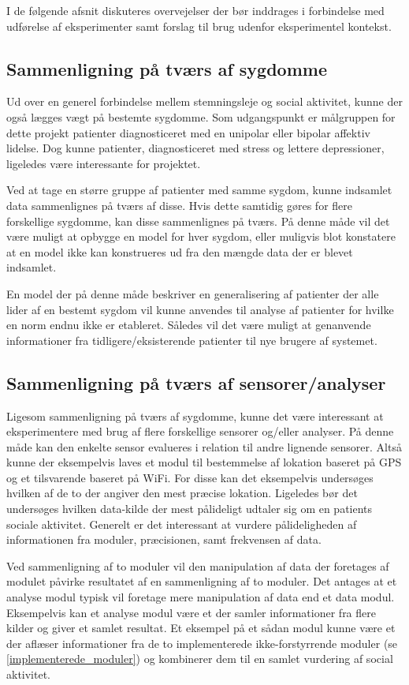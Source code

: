 I de følgende afsnit diskuteres overvejelser der bør inddrages i forbindelse med udførelse af eksperimenter samt forslag til brug udenfor eksperimentel kontekst.

\subsection{Sammenligning på tværs af sygdomme}\label{refleksion:tvaers_af_sygdomme}
Ud over en generel forbindelse mellem stemningsleje og social aktivitet, kunne der også lægges vægt på bestemte sygdomme.
Som udgangspunkt er målgruppen for dette projekt patienter diagnosticeret med en unipolar eller bipolar affektiv lidelse.
Dog kunne patienter, diagnosticeret med stress og lettere depressioner, ligeledes være interessante for projektet.

Ved at tage en større gruppe af patienter med samme sygdom, kunne indsamlet data sammenlignes på tværs af disse.
Hvis dette samtidig gøres for flere forskellige sygdomme, kan disse sammenlignes på tværs.
På denne måde vil det være muligt at opbygge en model for hver sygdom, eller muligvis blot konstatere at en model ikke kan konstrueres ud fra den mængde data der er blevet indsamlet.

En model der på denne måde beskriver en generalisering af patienter der alle lider af en bestemt sygdom vil kunne anvendes til analyse af patienter for hvilke en norm endnu ikke er etableret.
Således vil det være muligt at genanvende informationer fra tidligere/eksisterende patienter til nye brugere af systemet.

\subsection{Sammenligning på tværs af sensorer/analyser}
Ligesom sammenligning på tværs af sygdomme, kunne det være interessant at eksperimentere med brug af flere forskellige sensorer og/eller analyser.
På denne måde kan den enkelte sensor evalueres i relation til andre lignende sensorer.
Altså kunne der eksempelvis laves et modul til bestemmelse af lokation baseret på GPS og et tilsvarende baseret på WiFi.
For disse kan det eksempelvis undersøges hvilken af de to der angiver den mest præcise lokation.
Ligeledes bør det undersøges hvilken data-kilde der mest pålideligt udtaler sig om en patients sociale aktivitet.
Generelt er det interessant at vurdere pålideligheden af informationen fra moduler, præcisionen, samt frekvensen af data.

Ved sammenligning af to moduler vil den manipulation af data der foretages af modulet påvirke resultatet af en sammenligning af to moduler.
Det antages at et analyse modul typisk vil foretage mere manipulation af data end et data modul.
Eksempelvis kan et analyse modul være et der samler informationer fra flere kilder og giver et samlet resultat.
Et eksempel på et sådan modul kunne være et der aflæser informationer fra de to implementerede ikke-forstyrrende moduler (se \cref{implementerede_moduler}) og kombinerer dem til en samlet vurdering af social aktivitet.


